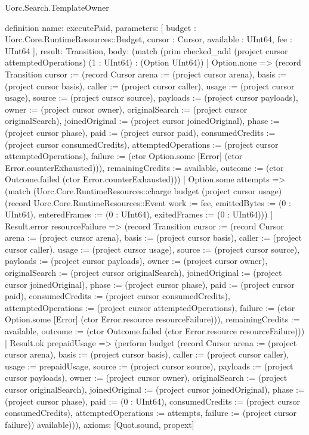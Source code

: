 \begin{lexlean}{Uorc.Search.TemplateOwner}
\begin{semanticmodule}
definition{
  name: executePaid,
  parameters: [
    budget : Uorc.Core.RuntimeResources::Budget,
    cursor : Cursor,
    available : UInt64,
    fee : UInt64
  ],
  result: Transition,
  body: (match (prim checked_add (project cursor attemptedOperations) (1 : UInt64) : (Option UInt64))
    | Option.none => (record Transition {cursor := (record Cursor {arena := (project cursor arena), basis := (project cursor basis), caller := (project cursor caller), usage := (project cursor usage), source := (project cursor source), payloads := (project cursor payloads), owner := (project cursor owner), originalSearch := (project cursor originalSearch), joinedOriginal := (project cursor joinedOriginal), phase := (project cursor phase), paid := (project cursor paid), consumedCredits := (project cursor consumedCredits), attemptedOperations := (project cursor attemptedOperations), failure := (ctor Option.some [Error] (ctor Error.counterExhausted))}), remainingCredits := available, outcome := (ctor Outcome.failed (ctor Error.counterExhausted))})
    | Option.some attempts => (match (Uorc.Core.RuntimeResources::charge budget (project cursor usage) (record Uorc.Core.RuntimeResources::Event {work := fee, emittedBytes := (0 : UInt64), enteredFrames := (0 : UInt64), exitedFrames := (0 : UInt64)}))
      | Result.error resourceFailure => (record Transition {cursor := (record Cursor {arena := (project cursor arena), basis := (project cursor basis), caller := (project cursor caller), usage := (project cursor usage), source := (project cursor source), payloads := (project cursor payloads), owner := (project cursor owner), originalSearch := (project cursor originalSearch), joinedOriginal := (project cursor joinedOriginal), phase := (project cursor phase), paid := (project cursor paid), consumedCredits := (project cursor consumedCredits), attemptedOperations := (project cursor attemptedOperations), failure := (ctor Option.some [Error] (ctor Error.resource resourceFailure))}), remainingCredits := available, outcome := (ctor Outcome.failed (ctor Error.resource resourceFailure))})
      | Result.ok prepaidUsage => (perform budget (record Cursor {arena := (project cursor arena), basis := (project cursor basis), caller := (project cursor caller), usage := prepaidUsage, source := (project cursor source), payloads := (project cursor payloads), owner := (project cursor owner), originalSearch := (project cursor originalSearch), joinedOriginal := (project cursor joinedOriginal), phase := (project cursor phase), paid := (0 : UInt64), consumedCredits := (project cursor consumedCredits), attemptedOperations := attempts, failure := (project cursor failure)}) available))),
  axioms: [Quot.sound, propext]
}


\end{semanticmodule}
\end{lexlean}
